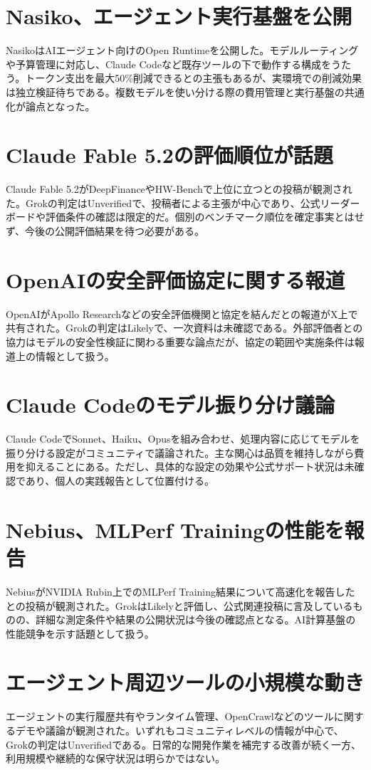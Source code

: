 \section{Nasiko、エージェント実行基盤を公開}
NasikoはAIエージェント向けのOpen Runtimeを公開した。モデルルーティングや予算管理に対応し、Claude Codeなど既存ツールの下で動作する構成をうたう。トークン支出を最大50\%削減できるとの主張もあるが、実環境での削減効果は独立検証待ちである。複数モデルを使い分ける際の費用管理と実行基盤の共通化が論点となった。

\section{Claude Fable 5.2の評価順位が話題}
Claude Fable 5.2がDeepFinanceやHW-Benchで上位に立つとの投稿が観測された。Grokの判定はUnverifiedで、投稿者による主張が中心であり、公式リーダーボードや評価条件の確認は限定的だ。個別のベンチマーク順位を確定事実とはせず、今後の公開評価結果を待つ必要がある。

\section{OpenAIの安全評価協定に関する報道}
OpenAIがApollo Researchなどの安全評価機関と協定を結んだとの報道がX上で共有された。Grokの判定はLikelyで、一次資料は未確認である。外部評価者との協力はモデルの安全性検証に関わる重要な論点だが、協定の範囲や実施条件は報道上の情報として扱う。

\section{Claude Codeのモデル振り分け議論}
Claude CodeでSonnet、Haiku、Opusを組み合わせ、処理内容に応じてモデルを振り分ける設定がコミュニティで議論された。主な関心は品質を維持しながら費用を抑えることにある。ただし、具体的な設定の効果や公式サポート状況は未確認であり、個人の実践報告として位置付ける。

\section{Nebius、MLPerf Trainingの性能を報告}
NebiusがNVIDIA Rubin上でのMLPerf Training結果について高速化を報告したとの投稿が観測された。GrokはLikelyと評価し、公式関連投稿に言及しているものの、詳細な測定条件や結果の公開状況は今後の確認点となる。AI計算基盤の性能競争を示す話題として扱う。

\section{エージェント周辺ツールの小規模な動き}
エージェントの実行履歴共有やランタイム管理、OpenCrawlなどのツールに関するデモや議論が観測された。いずれもコミュニティレベルの情報が中心で、Grokの判定はUnverifiedである。日常的な開発作業を補完する改善が続く一方、利用規模や継続的な保守状況は明らかではない。